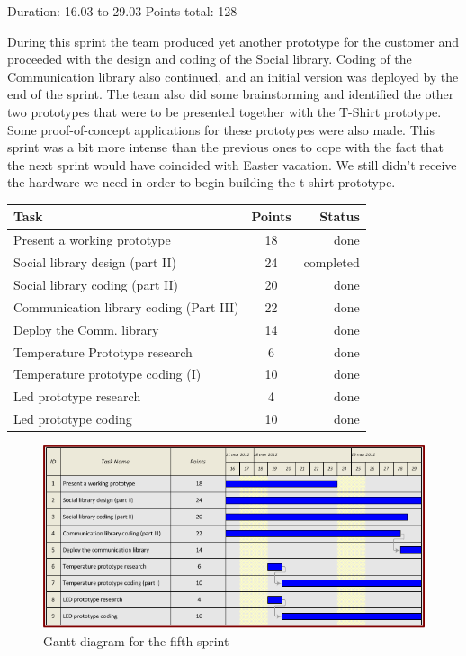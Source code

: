 Duration: 16.03 to 29.03
Points total: 128

During this sprint the team produced yet another prototype for the customer
and proceeded with the design and coding of the Social library.
Coding of the Communication library also continued, and an initial version
was deployed by the end of the sprint. The team also did some brainstorming
and identified the other two prototypes that were to be presented together with
the T-Shirt prototype. Some proof-of-concept applications for these
prototypes were also made. This sprint was a bit more intense than the previous
ones to cope with the fact that the next sprint would have coincided with Easter vacation.
We still didn't receive the hardware we need in order to begin building the t-shirt
prototype.

\begin{table}[ht!]
\begin{tabular}{ | l | c | r | }

\hline
\textbf{Task} & \textbf{Points} & \textbf{Status} \\
\hline

Present a working prototype		& 18 & done \\
\hline
Social library design (part II)		& 24 & completed \\
\hline
Social library coding (part II)		& 20 & done \\
\hline
Communication library coding (Part III)	& 22 & done \\
\hline
Deploy the Comm. library		& 14 & done \\
\hline
Temperature Prototype research		& 6  & done \\
\hline
Temperature prototype coding (I)	& 10 & done \\
\hline
Led prototype research			& 4  & done \\
\hline
Led prototype coding			& 10 & done \\
\hline

\end{tabular}
\end{table}


\begin{figure}[h!]
\centering \includegraphics[scale=0.8]{img/sprints-gantt5.png}
\caption{Gantt diagram for the fifth sprint}
\label{fig:sprints-gantt5}
\end{figure}


